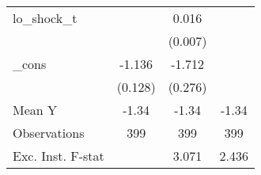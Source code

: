 {\begin{tabular}{l*{3}{c}}
\addlinespace
lo\_shock\_t  &                     &       0.016\sym{**} &                     \\
            &                     &     (0.007)         &                     \\
\addlinespace
\_cons      &      -1.136\sym{***}&      -1.712\sym{***}&                     \\
            &     (0.128)         &     (0.276)         &                     \\
\midrule
Mean Y      &       -1.34         &       -1.34         &       -1.34         \\
Observations&         399         &         399         &         399         \\
Exc. Inst. F-stat&                     &       3.071         &       2.436         \\
\bottomrule
\end{tabular}
}
